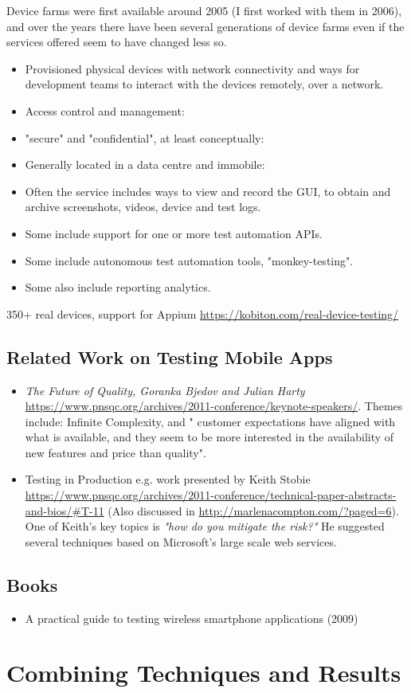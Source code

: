 Device farms were first available around 2005 (I first worked with them in 2006), and over the years there have been several generations of device farms even if the services offered seem to have changed less so.

\begin{itemize}
    \item Provisioned physical devices with network connectivity and ways for development teams to interact with the devices remotely, over a network.
    \item Access control and management:
    \item "secure" and "confidential", at least conceptually:
    \item Generally located in a data centre and immobile:
    \item Often the service includes ways to view and record the GUI, to obtain and archive screenshots, videos, device and test logs.
    \item Some include support for one or more test automation APIs.
    \item Some include autonomous test automation tools, "monkey-testing".
    \item Some also include reporting analytics.
\end{itemize}

350+ real devices, support for Appium  \url{https://kobiton.com/real-device-testing/}

\subsection{Related Work on Testing Mobile Apps}
\begin{itemize}
    \item \textit{The Future of Quality, Goranka Bjedov and Julian Harty} \url{https://www.pnsqc.org/archives/2011-conference/keynote-speakers/}. Themes include: Infinite Complexity, and " customer expectations have aligned with what is available, and they seem to be more interested in the availability of new features and price than quality".
    \item Testing in Production e.g. work presented by Keith Stobie \url{https://www.pnsqc.org/archives/2011-conference/technical-paper-abstracts-and-bios/#T-11} (Also discussed in \url{http://marlenacompton.com/?paged=6}). One of Keith's key topics is \textit{"how do you mitigate the risk?"} He suggested several techniques based on Microsoft's large scale web services. 
\end{itemize}
\subsection{Books}
\begin{itemize}
    \item A practical guide to testing wireless smartphone applications (2009)
\end{itemize}
\section{Combining Techniques and Results}
